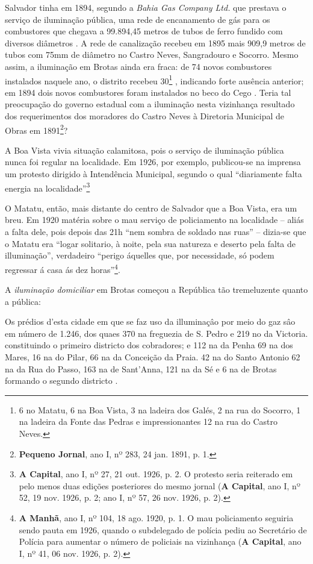 Salvador tinha em 1894, segundo a \textit{Bahia Gas Company Ltd.} que prestava o serviço de iluminação pública, uma rede de encanamento de gás para os combustores que chegava a 99.894,45 metros de tubos de ferro fundido com diversos diâmetros \cite[p.~178]{salvador_relatorio_1894}. A rede de canalização recebeu em 1895 mais 909,9 metros de tubos com 75mm de diâmetro no Castro Neves, Sangradouro e Socorro. Mesmo assim, a iluminação em Brotas ainda era fraca: de 74 novos combustores instalados naquele ano, o distrito recebeu 30\footnote{6 no Matatu, 6 na Boa Vista, 3 na ladeira dos Galés, 2 na rua do Socorro, 1 na ladeira da Fonte das Pedras e impressionantes 12 na rua do Castro Neves.} \cite[pp.~149-150]{salvador_relatorio_1895}, indicando forte ausência anterior; em 1894 dois novos combustores foram instalados no beco do Cego \cite[p.~179]{salvador_relatorio_1894}. Teria tal preocupação do governo estadual com a iluminação nesta vizinhança resultado dos requerimentos dos moradores do Castro Neves à Diretoria Municipal de Obras em 1891\footnote{\textbf{Pequeno Jornal}, ano I, nº 283, 24 jan. 1891, p. 1.}? 

A Boa Vista vivia situação calamitosa, pois o serviço de iluminação pública nunca foi regular na localidade. Em 1926, por exemplo, publicou-se na imprensa um protesto dirigido à Intendência Municipal, segundo o qual ``diariamente falta energia na localidade''\footnote{\textbf{A Capital}, ano I, nº 27, 21 out. 1926, p. 2. O protesto seria reiterado em pelo menos duas edições posteriores do mesmo jornal (\textbf{A Capital}, ano I, nº 52, 19 nov. 1926, p. 2; ano I, nº 57, 26 nov. 1926, p. 2).}

O Matatu, então, mais distante do centro de Salvador que a Boa Vista, era um breu. Em 1920 matéria sobre o mau serviço de policiamento na localidade -- aliás a falta dele, pois depois das 21h ``nem sombra de soldado nas ruas'' -- dizia-se que o Matatu era ``logar solitario, à noite, pela sua natureza e deserto pela falta de illuminação'', verdadeiro ``perigo áquelles que, por necessidade, só podem regressar á casa ás dez horas''\footnote{\textbf{A Manhã}, ano I, nº 104, 18 ago. 1920, p. 1. O mau policiamento seguiria sendo pauta em 1926, quando o subdelegado de polícia pediu ao Secretário de Polícia para aumentar o número de policiais na vizinhança (\textbf{A Capital}, ano I, nº 41, 06 nov. 1926, p. 2).}.

A \textit{iluminação domiciliar} em Brotas começou a República tão tremeluzente quanto a pública:

\begin{citacao}
Os prédios d'esta cidade em que se faz uso da illuminaçâo por meio do gaz sâo em número de 1.246, dos quaes 370 na freguezia de S. Pedro e 219 no da Victoria. constituindo o primeiro districto dos cobradores; e 112 na da Penha 69 na dos Mares, 16 na do Pilar, 66 na da Conceição da Praia. 42 na do Santo Antonio 62 na da Rua do Passo, 163 na de Sant'Anna, 121 na da Sé e 6 na de Brotas formando o segundo districto \cite[p.~151]{salvador_relatorio_1895}. 
\end{citacao}

